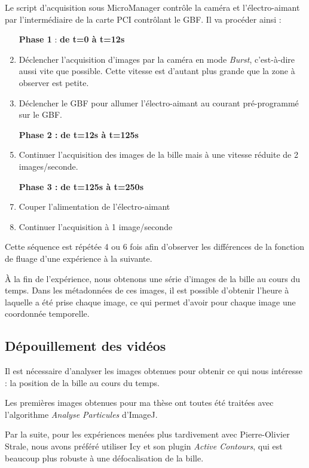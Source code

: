 \documentclass{report}
\begin{document}
	Le script d'acquisition sous MicroManager contrôle la caméra et l'électro-aimant par l'intermédiaire de la carte PCI contrôlant le GBF. Il va procéder ainsi : 
	
	\begin{enumerate}
	\item[\textbf{Phase 1} : ]\textbf{de t=0 à t=12s}
	\item Déclencher l'acquisition d'images par la caméra en mode \emph{Burst}, c'est-à-dire aussi vite que possible. Cette vitesse est d'autant plus grande que la zone à observer est petite. 
	\item Déclencher le GBF pour allumer l'électro-aimant au courant pré-programmé sur le GBF. 
	\item[\textbf{Phase 2 :} ] \textbf{de t=12s à t=125s}
	\item Continuer l'acquisition des images de la bille mais à une vitesse réduite de 2 images/seconde.
	\item[\textbf{Phase 3 : }] \textbf{de t=125s à t=250s}
	\item Couper l'alimentation de l'électro-aimant
	\item Continuer l'acquisition à 1 image/seconde
	
	\end{enumerate}
	
	Cette séquence est répétée 4 ou 6 fois afin d'observer les différences de la fonction de fluage d'une expérience à la suivante. 
	
	 \`A la fin de l'expérience, nous obtenons une série d'images de la bille au cours du temps. 
	 Dans les métadonnées de ces images, il est possible d'obtenir l'heure à laquelle a été prise chaque image, ce qui permet d'avoir pour chaque image une coordonnée temporelle. 
	
	\subsection{Dépouillement des vidéos}
	
	Il est nécessaire d'analyser les images obtenues pour obtenir ce qui nous intéresse : la position de la bille au cours du temps. 
	
	Les premières images obtenues pour ma thèse ont toutes été traitées avec l'algorithme \emph{Analyse Particules} d'ImageJ. 

Par la suite, pour les expériences menées plus tardivement avec Pierre-Olivier Strale, nous avons préféré utiliser Icy et son plugin \emph{Active Contours}, qui est beaucoup plus robuste à une défocalisation de la bille. 
\end{document}
